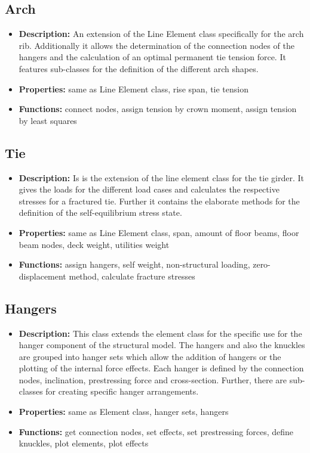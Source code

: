 \subsection*{Arch}
\begin{itemize}
    \item {\bf Description:} An extension of the Line Element class specifically for the arch rib. Additionally it allows the determination of the connection nodes of the hangers and the calculation of an optimal permanent tie tension force. It features sub-classes for the definition of the different arch shapes.
    \item {\bf Properties:} same as Line Element class, rise span, tie tension
    \item {\bf Functions:} connect nodes, assign tension by crown moment, assign tension by least squares
\end{itemize}

\subsection*{Tie}
\begin{itemize}
    \item {\bf Description:} Is is the extension of the line element class for the tie girder. It gives the loads for the different load cases and calculates the respective stresses for a fractured tie. Further it contains the elaborate methods for the definition of the self-equilibrium stress state. 
    \item {\bf Properties:} same as Line Element class, span, amount of floor beams, floor beam nodes, deck weight, utilities weight
    \item {\bf Functions:} assign hangers, self weight, non-structural loading, zero-displacement method, calculate fracture stresses
\end{itemize}

\subsection*{Hangers}
\begin{itemize}
    \item {\bf Description:} This class extends the element class for the specific use for the hanger component of the structural model. The hangers and also the knuckles are grouped into hanger sets which allow the addition of hangers or the plotting of the internal force effects. Each hanger is defined by the connection nodes, inclination, prestressing force and cross-section. Further, there are sub-classes for creating specific hanger arrangements.
    \item {\bf Properties:} same as Element class, hanger sets, hangers
    \item {\bf Functions:} get connection nodes, set effects, set prestressing forces, define knuckles, plot elements, plot effects
\end{itemize}



